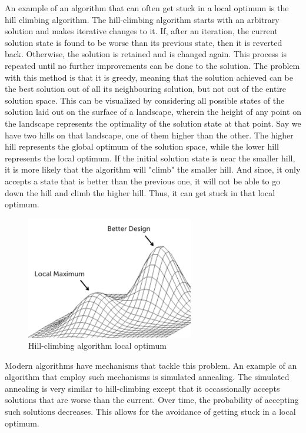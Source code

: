 An example of an algorithm that can often get stuck in a local optimum is the hill climbing algorithm. The hill-climbing algorithm starts with an arbitrary solution and makes iterative changes to it. If, after an iteration, the current solution state is found to be worse than its previous state, then it is reverted back. Otherwise, the solution is retained and is changed again. This process is repeated until no further improvements can be done to the solution. The problem with this method is that it is greedy, meaning that the solution achieved can be the best solution out of all its neighbouring solution, but not out of the entire solution space. This can be visualized by considering all possible states of the solution laid out on the surface of a landscape, wherein the height of any point on the landscape represents the optimality of the solution state at that point. Say we have two hills on that landscape, one of them higher than the other. The higher hill represents the global optimum of the solution space, while the lower hill represents the local optimum. If the initial solution state is near the smaller hill, it is more likely that the algorithm will "climb" the smaller hill. And since, it only accepts a state that is better than the previous one, it will not be able to go down the hill and climb the higher hill. Thus, it can get stuck in that local optimum.
\begin{figure}[h]
\begin{center}
\includegraphics[width=0.65\textwidth]{img/intro/hill_climbing}
\caption{Hill-climbing algorithm local optimum}
\end{center}
\end{figure}
Modern algorithms have mechanisms that tackle this problem. An example of an algorithm that employ such mechanisms is simulated annealing. The simulated annealing is very similar to hill-climbing except that it occassionally accepts solutions that are worse than the current. Over time, the probability of accepting such solutions decreases. This allows for the avoidance of getting stuck in a local optimum.

